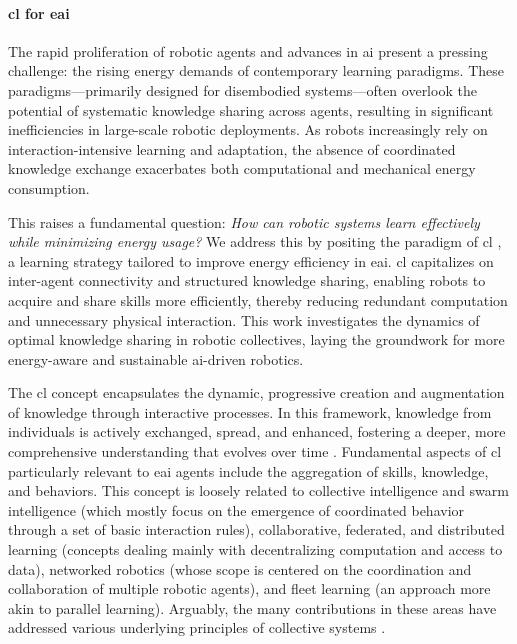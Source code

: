 \documentclass[12pt]{article}
\renewcommand{\emph}[1]{\textit{#1}}
\begin{document}
\paragraph*{\Acl{cl} for \ac{eai}} The rapid proliferation of robotic agents and advances in \ac{ai} present a pressing challenge: the rising energy demands of contemporary learning paradigms. These paradigms---primarily designed for disembodied systems---often overlook the potential of systematic knowledge sharing across agents, resulting in significant inefficiencies in large-scale robotic deployments. As robots increasingly rely on interaction-intensive learning and adaptation, the absence of coordinated knowledge exchange exacerbates both computational and mechanical energy consumption.

This raises a fundamental question: \emph{How can robotic systems learn effectively while minimizing energy usage?} We address this by positing the paradigm of \acl{cl} \cite{Haddadin2014SystemzumErstellen,Haddadin2015Systemgeneratingsets}, a learning strategy tailored to improve energy efficiency in \ac{eai}. \Ac{cl} capitalizes on inter-agent connectivity and structured knowledge sharing, enabling robots to acquire and share skills more efficiently, thereby reducing redundant computation and unnecessary physical interaction. This work investigates the dynamics of optimal knowledge sharing in robotic collectives, laying the groundwork for more energy-aware and sustainable \ac{ai}-driven robotics.

The \ac{cl} concept encapsulates the dynamic, progressive creation and augmentation of knowledge through interactive processes. In this framework, knowledge from individuals is actively exchanged, spread, and enhanced, fostering a deeper, more comprehensive understanding that evolves over time \cite{Garavan2012CollectiveLearning}. Fundamental aspects of \ac{cl} particularly relevant to \ac{eai} agents include the aggregation of skills, knowledge, and behaviors. This concept is loosely related to collective intelligence and swarm intelligence \cite{Beni2004SwarmIntelligenceSwarm,Blum2015SwarmIntelligenceOptimization,Dorigo2021SwarmRoboticsPast} (which mostly focus on the emergence of coordinated behavior through a set of basic interaction rules), collaborative, federated, and distributed learning \cite{Technologie2023FLAIROPFederatedLearning,Anjos2023SurveyCollaborativeLearning,Xianjia2021Federatedlearningrobotic,Sartoretti2019DistributedLearningDecentralized,Sartoretti2018DistributedLearningDecentralized,Wang2022DistributedReinforcementLearning} (concepts dealing mainly with decentralizing computation and access to data), networked robotics \cite{Kumar2008NetworkedRobots} (whose scope is centered on the coordination and collaboration of multiple robotic agents), and fleet learning \cite{Wang2023RobotFleetLearning} (an approach more akin to parallel learning). Arguably, the many contributions in these areas have addressed various underlying principles of collective systems \cite{Kernbach2013HandbookCollectiveRobotics}.
\end{document}
